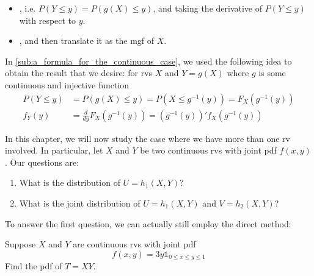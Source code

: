 \documentclass[notoc,notitlepage]{tufte-book}
\begin{document}
\begin{itemize}
  \item {}, i.e. $P(Y \leq y) = P( g(X) \leq y )$, and taking the derivative of $P(Y \leq y)$ with respect to $y$.
  \item {}, and then translate it as the mgf of $X$.
\end{itemize}

\begin{note}[Recall]
  In \cref{sub:a_formula_for_the_continuous_case}, we used the following idea to obtain the result that we desire: for rvs $X$ and $Y = g(X)$ where $g$ is some continuous and injective function
  \begin{align*}
    P(Y \leq y) &= P( g(X) \leq y ) = P(X \leq g^{-1}(y)) = F_X( g^{-1}(y) ) \\
    f_Y(y) &= \frac{d}{dy} F_X( g^{-1}(y) ) = ( g^{-1}(y) )' f_X( g^{-1}(y) )
  \end{align*}
\end{note}

In this chapter, we will now study the case where we have more than one rv involved. In particular, let $X$ and $Y$ be two continuous rvs with joint pdf $f(x, y)$. Our questions are:
\begin{enumerate}
  \item What is the distribution of $U = h_1( X, Y )$?
  \item What is the joint distribution of $U = h_1(X, Y)$ and $V = h_2 (X, Y)$?
\end{enumerate}

To answer the first question, we can actually still employ the direct method:

\begin{eg}\label{eg:4_1}
  Suppose $X$ and $Y$ are continuous rvs with joint pdf
  \begin{equation*}
    f(x, y) = 3y \mathbb{1}_{0 \leq x \leq y \leq 1}
  \end{equation*}
  Find the pdf of $T = XY$.
\end{eg}
\end{document}
